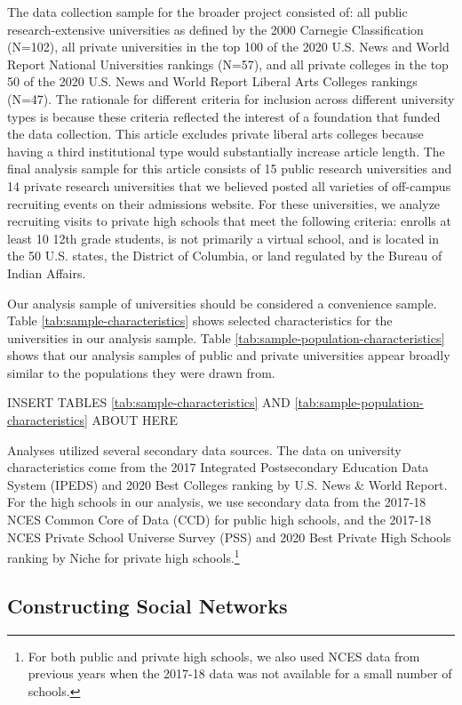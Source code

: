 \documentclass[
  12pt,
]{article}
\begin{document}
The data collection sample for the broader project consisted of: all public research-extensive universities as defined by the 2000 Carnegie Classification (N=102), all private universities in the top 100 of the 2020 U.S. News and World Report National Universities rankings (N=57), and all private colleges in the top 50 of the 2020 U.S. News and World Report Liberal Arts Colleges rankings (N=47). The rationale for different criteria for inclusion across different university types is because these criteria reflected the interest of a foundation that funded the data collection. This article excludes private liberal arts colleges because having a third institutional type would substantially increase article length. The final analysis sample for this article consists of 15 public research universities and 14 private research universities that we believed posted all varieties of off-campus recruiting events on their admissions website. For these universities, we analyze recruiting visits to private high schools that meet the following criteria: enrolls at least 10 12th grade students, is not primarily a virtual school, and is located in the 50 U.S. states, the District of Columbia, or land regulated by the Bureau of Indian Affairs.

Our analysis sample of universities should be considered a convenience sample. Table \ref{tab:sample-characteristics} shows selected characteristics for the universities in our analysis sample. Table \ref{tab:sample-population-characteristics} shows that our analysis samples of public and private universities appear broadly similar to the populations they were drawn from.

INSERT TABLES \ref{tab:sample-characteristics} AND \ref{tab:sample-population-characteristics} ABOUT HERE

Analyses utilized several secondary data sources. The data on university characteristics come from the 2017 Integrated Postsecondary Education Data System (IPEDS) and 2020 Best Colleges ranking by U.S. News \& World Report. For the high schools in our analysis, we use secondary data from the 2017-18 NCES Common Core of Data (CCD) for public high schools, and the 2017-18 NCES Private School Universe Survey (PSS) and 2020 Best Private High Schools ranking by Niche for private high schools.\footnote{For both public and private high schools, we also used NCES data from previous years when the 2017-18 data was not available for a small number of schools.}

\subsection{Constructing Social Networks}\label{constructing-social-networks}
\end{document}
